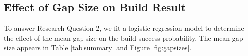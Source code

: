 \documentclass[12pt,oneside]{book}
\begin{document}








\subsection{Effect of Gap Size on Build Result}
\label{sec:gapsizeresult}

To answer Research Question 2, we fit a logistic regression model to determine the effect of the mean gap size on the build success probability. The mean gap size appears in Table \ref{tab:summary} and Figure \ref{fig:gapsizes}.
\end{document}
